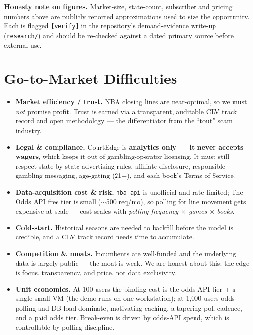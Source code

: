 \documentclass[12pt]{article}
\begin{document}
\begin{mdframed}\small
\textbf{Honesty note on figures.} Market-size, state-count, subscriber and pricing numbers
above are publicly reported approximations used to size the opportunity. Each is flagged
\texttt{[verify]} in the repository's demand-evidence write-up (\texttt{research/}) and should
be re-checked against a dated primary source before external use.
\end{mdframed}

\section{Go-to-Market Difficulties}
\label{sec:gtm}

\begin{itemize}[nosep]
  \item \textbf{Market efficiency / trust.} NBA closing lines are near-optimal, so we must
    \emph{not} promise profit. Trust is earned via a transparent, auditable CLV track record
    and open methodology --- the differentiator from the ``tout'' scam industry.
  \item \textbf{Legal \& compliance.} CourtEdge is \textbf{analytics only --- it never accepts
    wagers}, which keeps it out of gambling-operator licensing. It must still respect
    state-by-state advertising rules, affiliate disclosure, responsible-gambling messaging,
    age-gating (21+), and each book's Terms of Service.
  \item \textbf{Data-acquisition cost \& risk.} \texttt{nba\_api} is unofficial and
    rate-limited; The Odds API free tier is small ($\sim$500 req/mo), so polling for line
    movement gets expensive at scale --- cost scales with \emph{polling frequency $\times$
    games $\times$ books}.
  \item \textbf{Cold-start.} Historical seasons are needed to backfill before the model is
    credible, and a CLV track record needs time to accumulate.
  \item \textbf{Competition \& moats.} Incumbents are well-funded and the underlying data is
    largely public --- the moat is weak. We are honest about this: the edge is focus,
    transparency, and price, not data exclusivity.
  \item \textbf{Unit economics.} At 100 users the binding cost is the odds-API tier + a single
    small VM (the demo runs on one workstation); at 1{,}000 users odds polling and DB load
    dominate, motivating caching, a tapering poll cadence, and a paid odds tier. Break-even is
    driven by odds-API spend, which is controllable by polling discipline.
\end{itemize}
\end{document}
